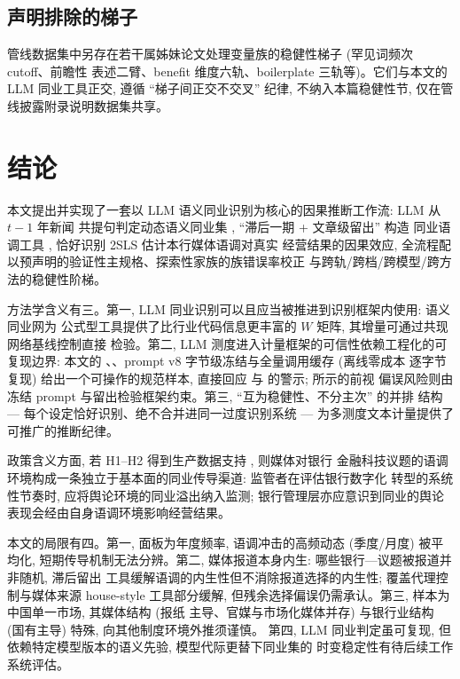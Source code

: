 \subsection{声明排除的梯子}
管线数据集中另存在若干属姊妹论文处理变量族的稳健性梯子 (罕见词频次 cutoff、前瞻性
表述二臂、benefit 维度六轨、boilerplate 三轨等)。它们与本文的 LLM 同业工具正交,
遵循 ``梯子间正交不交叉'' 纪律, 不纳入本篇稳健性节, 仅在管线披露附录说明数据集共享。

\section{结论}\label{sec:concl}

本文提出并实现了一套以 LLM 语义同业识别为核心的因果推断工作流: LLM 从 $t-1$ 年新闻
共提句判定动态语义同业集 \parencite{cao2025genai}, ``滞后一期 + 文章级留出'' 构造
同业语调工具 \parencite{leary2014peerfirms,
manski1993reflection,bramoulle2009networks}, 恰好识别 2SLS 估计本行媒体语调对真实
经营结果的因果效应, 全流程配以预声明的验证性主规格、探索性家族的族错误率校正
\parencite{romano2005stepdown} 与跨轨/跨档/跨模型/跨方法的稳健性阶梯。

方法学含义有三。第一, LLM 同业识别可以且应当被推进到识别框架内使用: 语义同业网为
公式型工具提供了比行业代码信息更丰富的 $W$ 矩阵, 其增量可通过共现网络基线控制直接
检验。第二, LLM 测度进入计量框架的可信性依赖工程化的可复现边界: 本文的
、、prompt v8 字节级冻结与全量调用缓存 (离线零成本
逐字节复现) 给出一个可操作的规范样本, 直接回应 \textcite{baumann2025llmhacking} 与
\textcite{ludwig2025llmframework} 的警示; \textcite{levy2026lookahead} 所示的前视
偏误风险则由冻结 prompt 与留出检验框架约束。第三, ``互为稳健性、不分主次'' 的并排
结构 --- 每个设定恰好识别、绝不合并进同一过度识别系统 --- 为多测度文本计量提供了
可推广的推断纪律。

政策含义方面, 若 H1--H2 得到生产数据支持 , 则媒体对银行
金融科技议题的语调环境构成一条独立于基本面的同业传导渠道: 监管者在评估银行数字化
转型的系统性节奏时, 应将舆论环境的同业溢出纳入监测; 银行管理层亦应意识到同业的舆论
表现会经由自身语调环境影响经营结果。

本文的局限有四。第一, 面板为年度频率, 语调冲击的高频动态 (季度/月度) 被平均化,
短期传导机制无法分辨。第二, 媒体报道本身内生: 哪些银行—议题被报道并非随机, 滞后留出
工具缓解语调的内生性但不消除报道选择的内生性; 覆盖代理控制与媒体来源 house-style
工具部分缓解, 但残余选择偏误仍需承认。第三, 样本为中国单一市场, 其媒体结构 (报纸
主导、官媒与市场化媒体并存) 与银行业结构 (国有主导) 特殊, 向其他制度环境外推须谨慎。
第四, LLM 同业判定虽可复现, 但依赖特定模型版本的语义先验, 模型代际更替下同业集的
时变稳定性有待后续工作系统评估。

\printbibliography


